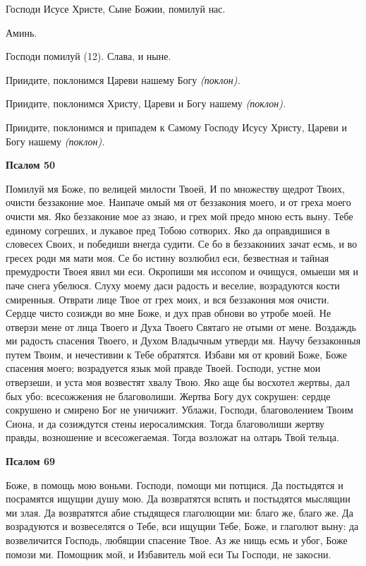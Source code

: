 Господи Исусе Христе, Сыне Божии, помилуй нас.


Аминь.


Господи помилуй (12). Слава, и ныне.


Приидите, поклонимся Цареви нашему Богу \itshape (поклон)\normalfont{}.


Приидите, поклонимся Христу, Цареви и Богу нашему \itshape (поклон)\normalfont{}.


Приидите, поклонимся и припадем к Самому Господу Исусу Христу, Цареви и Богу нашему \itshape (поклон)\normalfont{}.





\bfseries Псалом 50\normalfont{}


Помилуй мя Боже, по велицей милости Твоей, И по множеству щедрот Твоих, очисти беззаконие мое. Наипаче омый мя от беззакония моего, и от греха моего очисти мя. Яко беззаконие мое аз знаю, и грех мой предо мною есть выну. Тебе единому согреших, и лукавое пред Тобою сотворих. Яко да оправдишися в словесех Своих, и победиши внегда судити. Се бо в беззакониих зачат есмь, и во гресех роди мя мати моя. Се бо истину возлюбил еси, безвестная и тайная премудрости Твоея явил ми еси. Окропиши мя иссопом и очищуся, омыеши мя и паче снега убелюся. Слуху моему даси радость и веселие, возрадуются кости смиренныя. Отврати лице Твое от грех моих, и вся беззакония моя очисти. Сердце чисто созижди во мне Боже, и дух прав обнови во утробе моей. Не отверзи мене от лица Твоего и Духа Твоего Святаго не отыми от мене. Воздаждь ми радость спасения Твоего, и Духом Владычным утверди мя. Научу беззаконныя путем Твоим, и нечестивии к Тебе обратятся. Избави мя от кровий Боже, Боже спасения моего; возрадуется язык мой правде Твоей. Господи, устне мои отверзеши, и уста моя возвестят хвалу Твою. Яко аще бы восхотел жертвы, дал бых убо: всесожжения не благоволиши. Жертва Богу дух сокрушен: сердце сокрушено и смирено Бог не уничижит. Ублажи, Господи, благоволением Твоим Сиона, и да созиждутся стены иеросалимския. Тогда благоволиши жертву правды, возношение и всесожегаемая. Тогда возложат на олтарь Твой тельца.





\bfseries Псалом 69\normalfont{}


Боже, в помощь мою воньми. Господи, помощи ми потщися. Да постыдятся и посрамятся ищущии душу мою. Да возвратятся вспять и постыдятся мыслящии ми злая. Да возвратятся абие стыдящеся глаголющии ми: благо же, благо же. Да возрадуются и возвеселятся о Тебе, вси ищущии Тебе, Боже, и глаголют выну: да возвеличится Господь, любящии спасение Твое. Аз же нищь есмь и убог, Боже помози ми. Помощник мой, и Избавитель мой еси Ты Господи, не закосни.





